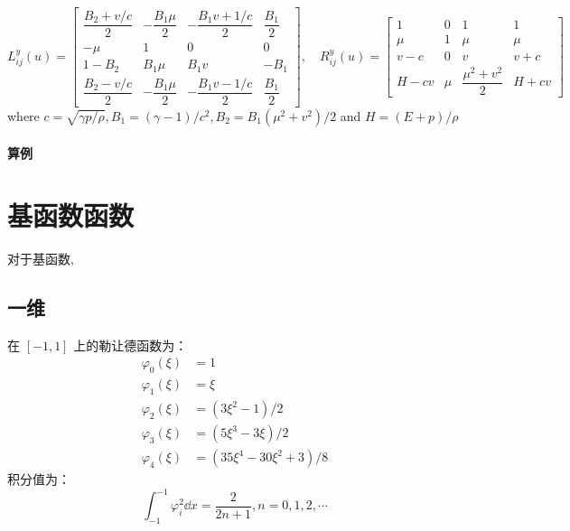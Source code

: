 \documentclass{book}
\begin{document}
\begin{equation}
    L_{i j}^{y}(u)=\begin{bmatrix}
        \dfrac{B_{2}+v / c}{2} & -\dfrac{B_{1} \mu}{2} & -\dfrac{B_{1} v+1 / c}{2} & \dfrac{B_{1}}{2} \\
        -\mu                   & 1                     & 0                         & 0                \\
        1-B_{2}                & B_{1} \mu             & B_{1} v                   & -B_{1}           \\
        \dfrac{B_{2}-v / c}{2} & -\dfrac{B_{1} \mu}{2} & -\dfrac{B_{1} v-1 / c}{2} & \dfrac{B_{1}}{2}
    \end{bmatrix},\quad
    R_{i j}^{y}(u)=\begin{bmatrix}
        1     & 0   & 1                        & 1     \\
        \mu   & 1   & \mu                      & \mu   \\
        v-c   & 0   & v                        & v+c   \\
        H-c v & \mu & \dfrac{\mu^{2}+v^{2}}{2} & H+c v
    \end{bmatrix}
\end{equation}
where  $c=\sqrt{\gamma p / \rho}, B_{1}=(\gamma-1) / c^{2}, B_{2}=B_{1}\left(\mu^{2}+v^{2}\right) / 2$  and  $H=(E+p) / \rho$
\paragraph{算例}


\newpage
\section{基函数函数}
对于基函数,
\cite{RN48}
\subsection{一维}
在 $[-1,1]$ 上的勒让德函数为：
\begin{equation}
    \begin{aligned}
        \varphi_{0}(\xi) & =1                                        \\
        \varphi_{1}(\xi) & =\xi                                      \\
        \varphi_{2}(\xi) & =\left(3 \xi^{2}-1\right) / 2             \\
        \varphi_{3}(\xi) & =\left(5 \xi^{3}-3 \xi\right) / 2         \\
        \varphi_{4}(\xi) & =\left(35 \xi^{4}-30 \xi^{2}+3\right) / 8
    \end{aligned}
\end{equation}
积分值为：
\begin{equation}
    \int_{-1}^{-1}\varphi_i^2\dd x=\frac{2}{2n+1},n=0,1,2,\cdots
\end{equation}
\end{document}
